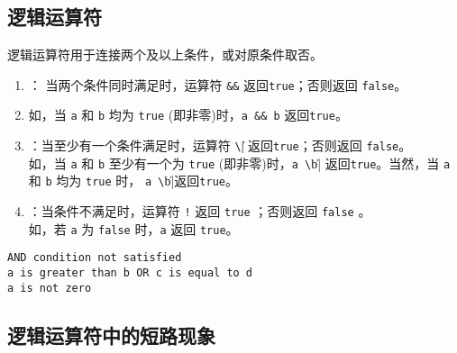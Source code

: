\subsection{逻辑运算符}
\begin{frame}
  逻辑运算符用于连接两个及以上条件，或对原条件取否。\\[.1in]
\begin{enumerate}
\item
  ： 当两个条件同时满足时，运算符 \lstinline|&&| 返回\lstinline|true|；否则返回 \lstinline|false|。\\[.1in]
\item[] 如，当 \lstinline|a| 和 \lstinline|b| 均为 \lstinline|true| (即非零)时，\lstinline|a && b| 返回\lstinline|true|。\\[.1in]
\item
  ：当至少有一个条件满足时，运算符 \lstinline|\|\|| 返回\lstinline|true|；否则返回 \lstinline|false|。\\[.1in]
  如，当 \lstinline|a| 和 \lstinline|b| 至少有一个为 \lstinline|true| (即非零)时，\lstinline|a \|\| b| 返回\lstinline|true|。当然，当 \lstinline|a| 和 \lstinline|b| 均为 \lstinline|true| 时， \lstinline|a \|\| b|返回\lstinline|true|。\\[.1in]
\item
  ：当条件不满足时，运算符 \lstinline|!| 返回 \lstinline|true| ；否则返回 \lstinline|false| 。\\[.1in]
如，若 \lstinline|a| 为 \lstinline|false| 时，\lstinline|a| 返回 \lstinline|true|。
\end{enumerate}
  
\end{frame}

\begin{frame}\ft{\subsecname}

  
\end{frame}


\begin{frame}[fragile]\ft{\subsecname}

\begin{lstlisting}[backgroundcolor=\color{red!10},frame=no]
AND condition not satisfied
a is greater than b OR c is equal to d
a is not zero  
\end{lstlisting}
\end{frame}

\subsection{逻辑运算符中的短路现象}

